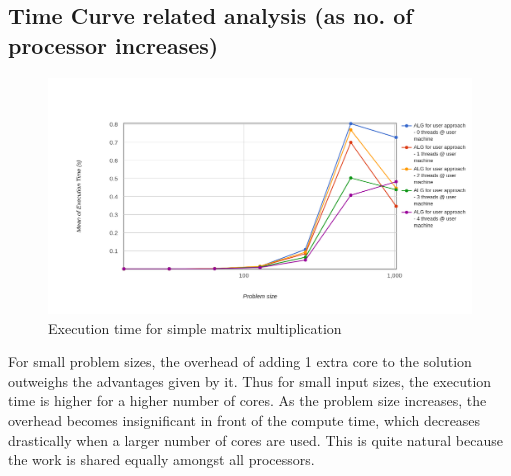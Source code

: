 \documentclass[runningheads, a4paper, oribibl]{llncs}
\begin{document}
\subsection{Time Curve related analysis (as no. of processor increases)}
\begin{figure}[H]
    \centering
    \includegraphics[width=\textwidth]{p4.png}
    \caption{Execution time for simple matrix multiplication}
    \label{fig:p4}
\end{figure}
For small problem sizes, the overhead of adding 1 extra core to the solution outweighs the advantages given by it. Thus for small input sizes, the execution time is higher for a higher number of cores. As the problem size increases, the overhead becomes insignificant in front of the compute time, which decreases drastically when a larger number of cores are used. This is quite natural because the work is shared equally amongst all processors.
\end{document}
